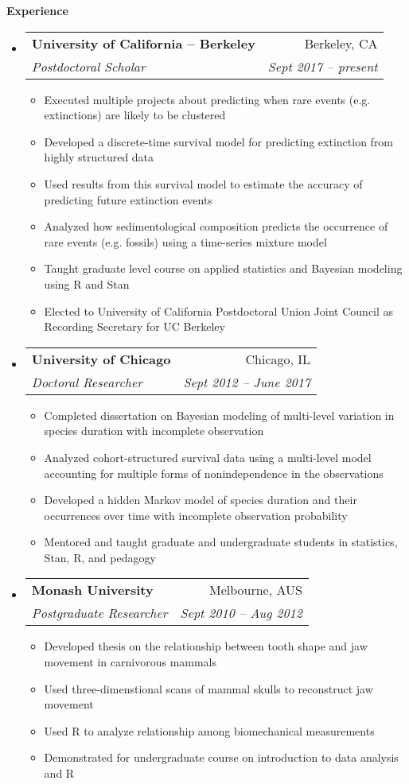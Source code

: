 \documentclass[letterpaper,11pt]{article}
\makeatletter
\newcommand{\resitem}[1]{\item #1 \vspace{-2pt}}
\newcommand{\resheading}[1]{{\large \colorbox{mygrey}{\begin{minipage}{\textwidth}{\textbf{#1 \vphantom{p\^{E}}}}\end{minipage}}}}
\newcommand{\ressubheading}[4]{
  \begin{tabular*}{6.5in}{l@{\extracolsep{\fill}}r}
    \textbf{#1} & #2 \\
    \textit{#3} & \textit{#4} \\
\end{tabular*}\vspace{-6pt}}
\makeatother
\begin{document}
\resheading{Experience}
\begin{itemize}
  \item 
    \ressubheading{University of California -- Berkeley}{Berkeley, CA}{Postdoctoral Scholar}{Sept 2017 -- present}
    { \footnotesize
      \begin{itemize}
          \resitem{Executed multiple projects about predicting when rare events (e.g. extinctions) are likely to be clustered }
          \resitem{Developed a discrete-time survival model for predicting extinction from highly structured data }
          \resitem{Used results from this survival model to estimate the accuracy of predicting future extinction events }
          \resitem{Analyzed how sedimentological composition predicts the occurrence of rare events (e.g. fossils) using a time-series mixture model }
          \resitem{Taught graduate level course on applied statistics and Bayesian modeling using R and Stan }
          \resitem{Elected to University of California Postdoctoral Union Joint Council as Recording Secretary for UC Berkeley }
      \end{itemize}
    }
  \item 
    \ressubheading{University of Chicago}{Chicago, IL}{Doctoral Researcher}{Sept 2012 -- June 2017}
    { \footnotesize
      \begin{itemize}
          \resitem{Completed dissertation on Bayesian modeling of multi-level variation in species duration with incomplete observation }
          \resitem{Analyzed cohort-structured survival data using a multi-level model accounting for multiple forms of nonindependence in the observations }
          \resitem{Developed a hidden Markov model of species duration and their occurrences over time with incomplete observation probability }
          \resitem{Mentored and taught graduate and undergraduate students in statistics, Stan, R, and pedagogy }
      \end{itemize}
    }
		\item 
			\ressubheading{Monash University}{Melbourne, AUS}{Postgraduate Researcher}{Sept 2010 -- Aug 2012}
				{ \footnotesize
				\begin{itemize}
            \resitem{Developed thesis on the relationship between tooth shape and jaw movement in carnivorous mammals }
            \resitem{Used three-dimenstional scans of mammal skulls to reconstruct jaw movement }
            \resitem{Used R to analyze relationship among biomechanical measurements }
            \resitem{Demonstrated for undergraduate course on introduction to data analysis and R }

\end{itemize}}
\end{itemize}
\end{document}
